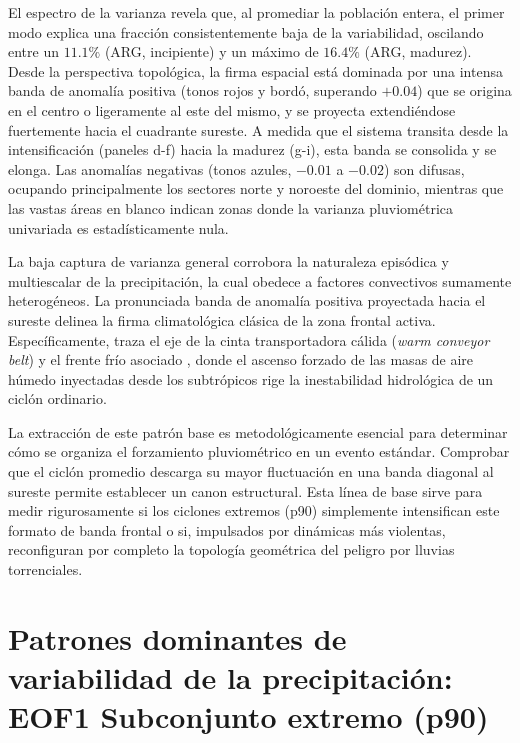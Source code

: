 El espectro de la varianza revela que, al promediar la población entera, el primer modo explica una fracción consistentemente baja de la variabilidad, oscilando entre un $11.1\%$ (ARG, incipiente) y un máximo de $16.4\%$ (ARG, madurez). Desde la perspectiva topológica, la firma espacial está dominada por una intensa banda de anomalía positiva (tonos rojos y bordó, superando $+0.04$) que se origina en el centro o ligeramente al este del mismo, y se proyecta extendiéndose fuertemente hacia el cuadrante sureste. A medida que el sistema transita desde la intensificación (paneles d-f) hacia la madurez (g-i), esta banda se consolida y se elonga. Las anomalías negativas (tonos azules, $-0.01$ a $-0.02$) son difusas, ocupando principalmente los sectores norte y noroeste del dominio, mientras que las vastas áreas en blanco indican zonas donde la varianza pluviométrica univariada es estadísticamente nula.

La baja captura de varianza general corrobora la naturaleza episódica y multiescalar de la precipitación, la cual obedece a factores convectivos sumamente heterogéneos. La pronunciada banda de anomalía positiva proyectada hacia el sureste delinea la firma climatológica clásica de la zona frontal activa. Específicamente, traza el eje de la cinta transportadora cálida (\textit{warm conveyor belt}) y el frente frío asociado , donde el ascenso forzado de las masas de aire húmedo inyectadas desde los subtrópicos rige la inestabilidad hidrológica de un ciclón ordinario.

La extracción de este patrón base es metodológicamente esencial para determinar cómo se organiza el forzamiento pluviométrico en un evento estándar. Comprobar que el ciclón promedio descarga su mayor fluctuación en una banda diagonal al sureste permite establecer un canon estructural. Esta línea de base sirve para medir rigurosamente si los ciclones extremos (p90) simplemente intensifican este formato de banda frontal o si, impulsados por dinámicas más violentas, reconfiguran por completo la topología geométrica del peligro por lluvias torrenciales.

\vspace{1em}

\section{Patrones dominantes de variabilidad de la precipitación: EOF1 Subconjunto extremo (p90)}\label{sec:eof1_tp_p90}

